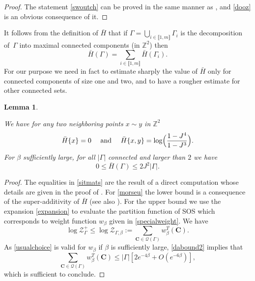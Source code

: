 \documentclass[JEP,XML,SOM,Unicode, NoFloatCountersInSection]{cedram}
\let\mathcal\mathscr
\numberwithin{equation}{section}
\theoremstyle{plain}
\newtheorem{lemma}[theorem]{Lemma}
\theoremstyle{definition}
\newcommand{\lint}{\llbracket}
\newcommand{\rint}{\rrbracket}
\newcommand{\cQ}{{\ensuremath{\mathcal Q}} }
\newcommand{\cZ}{{\ensuremath{\mathcal Z}} }
\newcommand{\bC}{{\ensuremath{\mathbf C}} }
\newcommand{\bbZ}{{\ensuremath{\mathbb Z}} }
\newcommand{\gb}{\beta}
\newcommand{\gG}{\Gamma}
\begin{document}
\begin{proof}
The statement \eqref{swoutch} can be proved in the same manner as \cite[Lem.\,3.1 \& Lem.\,3.2]{cf:part1}, and \eqref{dooz} is an obvious consequence of it.
\end{proof}

It follows from the definition of $\bar H$ that if
$\gG=\bigcup_{i\in \lint 1, m\rint} \gG_i$ is the decomposition of~$\gG$ into maximal connected components (in $\bbZ^2$) then
\begin{equation}\label{maxdecomp}
\bar H(\gG)=\sum_{i\in \lint 1, m\rint} \bar H(\gG_i).
\end{equation}
For our purpose we need in fact to estimate sharply the value of $\bar H$ only for connected components of size one and two,
and to have a rougher estimate for other connected sets.

\begin{lemma}\label{zoomats}

We have for any two neighboring points $x\sim y$ in $\bbZ^2$
\begin{equation}\label{sitmats}
\bar H\{x\}=0 \quad \text{ and } \quad \bar H\{x,y\}=\log \Bigl(\frac{1-J^4}{1-J^3}\Bigr).
\end{equation}
For $\gb$ sufficiently large,
for all $|\gG|$ connected and larger than $2$ we have
\begin{equation}\label{morseu}
0\le \bar H(\gG)\le 2J^2|\gG|.
\end{equation}
\end{lemma}

\begin{proof}
The equalities in \eqref{sitmats} are the result of a direct computation whose details are given in the proof of \cite[Lem.\,3.2]{cf:part1}.
For \eqref{morseu} the lower bound is a consequence of the super-additivity of $\bar H$ (see also \cite[Lem.\,3.2]{cf:part1}). For the upper bound we use the expansion \eqref{expansion} to evaluate the partition function of SOS which corresponds to weight function $w_{\gb}$ given in \eqref{specialweight}.
We have
\begin{equation*}
\log \cZ^+_{\gG}\le \log \cZ_{\gG,\gb}:=\sum_{\bC\in \cQ(\gG)} w_{\gb}^T(\bC).
\end{equation*}
As \eqref{usualchoice} is valid for $w_{\gb}$ if $\gb$ is sufficiently large, \eqref{dabound2} implies that
\begin{equation}\label{treck}
\sum_{\bC\in \cQ(\gG)} w_{\gb}^T(\bC)\le |\gG|\left[ 2e^{-4\gb}+O(e^{-6\gb})\right],
\end{equation}
which is sufficient to conclude.
\end{proof}
\end{document}
